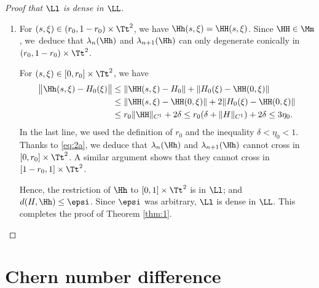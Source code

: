 \begin{proof}[Proof that $\Ll$ is dense in $\LL$]
\begin{enumerate}
\item
For $(s,\xi) \in (r_0,1-r_0) \times \Tt^2$, we have $\Hh(s,\xi) = \HH(s,\xi)$. Since $\HH \in \Mm$, we~deduce that $\lambda_n(\Hh)$ and $\lambda_{n+1}(\Hh)$ can only degenerate conically in $(r_0,1-r_0) \times \Tt^2$.

For $(s,\xi) \in [0,r_0] \times \Tt^2$, we have
\[
\begin{split}
\big\| \Hh(s,\xi) - H_0(\xi) \big\| &\leq \| \HH(s,\xi)-H_0 \| + \| H_0(\xi) -\HH(0,\xi) \|
\\
&\leq \| \HH(s,\xi)-\HH(0,\xi) \| + 2\| H_0(\xi) -\HH(0,\xi) \|
\\
&\leq r_0 \| \HH \|_{C^1} + 2 \delta \leq r_0 (\delta + \|H\|_{C^1}) + 2 \delta \leq 3\eta_0.
\end{split}
\]
In the last line, we used the definition of $r_0$ and the inequality $\delta < \eta_0 < 1$. Thanks to \eqref{eq:2a}, we deduce that $\lambda_n(\Hh)$ and $\lambda_{n+1}(\Hh)$ cannot cross in $[0,r_0] \times \Tt^2$. A similar argument shows that they cannot cross in $[1-r_0,1] \times \Tt^2$.

Hence, the restriction of $\Hh$ to $[0,1] \times \Tt^2$ is in $\Ll$; and $d(H,\Hh) \leq \epsi$. Since $\epsi$ was arbitrary, $\Ll$ is dense in $\LL$. This completes the proof of Theorem \ref{thm:1}.\qedhere
\end{enumerate}
\end{proof}

\section{Chern number difference}\label{sec:5}

